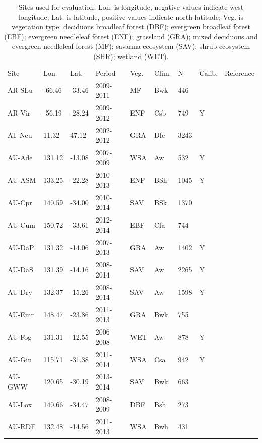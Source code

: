 \documentclass[gmd, manuscript]{copernicus}
\begin{document}
\begin{table}
\caption{Sites used for evaluation. Lon. is longitude, negative values indicate west longitude; Lat. is latitude, positive values indicate north latitude; Veg. is vegetation type: deciduous broadleaf forest (DBF); evergreen broadleaf forest (EBF); evergreen needleleaf forest (ENF); grassland (GRA); mixed deciduous and evergreen needleleaf forest (MF); savanna ecosystem (SAV); shrub ecosystem (SHR); wetland (WET).} 
\begin{tabular}{lllllllll}
  \tophline
  Site & Lon. & Lat. & Period & Veg. & Clim. & N & Calib. & Reference \\ 
  \middlehline
  AR-SLu & -66.46 & -33.46 & 2009-2011 & MF & Bwk & 446 &  & \citet{AR-SLu} \\ 
  AR-Vir & -56.19 & -28.24 & 2009-2012 & ENF & Csb & 749 & Y & \citet{AR-Vir} \\ 
  AT-Neu & 11.32 & 47.12 & 2002-2012 & GRA & Dfc & 3243 &  & \citet{AT-Neu} \\ 
  AU-Ade & 131.12 & -13.08 & 2007-2009 & WSA & Aw & 532 & Y & \citet{AU-Ade} \\ 
  AU-ASM & 133.25 & -22.28 & 2010-2013 & ENF & BSh & 1045 & Y & \citet{AU-ASM} \\ 
  AU-Cpr & 140.59 & -34.00 & 2010-2014 & SAV & BSk & 1370 &  & \citet{AU-Cpr} \\ 
  AU-Cum & 150.72 & -33.61 & 2012-2014 & EBF & Cfa & 744 &  & \citet{AU-Cum} \\ 
  AU-DaP & 131.32 & -14.06 & 2007-2013 & GRA & Aw & 1402 & Y & \citet{AU-DaP} \\ 
  AU-DaS & 131.39 & -14.16 & 2008-2014 & SAV & Aw & 2265 & Y & \citet{AU-DaS} \\ 
  AU-Dry & 132.37 & -15.26 & 2008-2014 & SAV & Aw & 1598 & Y & \citet{AU-Dry} \\ 
  AU-Emr & 148.47 & -23.86 & 2011-2013 & GRA & Bwk & 755 &  & \citet{AU-Emr} \\ 
  AU-Fog & 131.31 & -12.55 & 2006-2008 & WET & Aw & 878 & Y & \citet{AU-Fog} \\ 
  AU-Gin & 115.71 & -31.38 & 2011-2014 & WSA & Csa & 942 & Y & \citet{AU-Gin} \\ 
  AU-GWW & 120.65 & -30.19 & 2013-2014 & SAV & Bwk & 663 &  & \citet{AU-GWW} \\ 
  AU-Lox & 140.66 & -34.47 & 2008-2009 & DBF & Bsh & 273 &  & \citet{AU-Lox} \\ 
  AU-RDF & 132.48 & -14.56 & 2011-2013 & WSA & Bwh & 431 &  & \citet{AU-RDF} \\ 

\end{tabular}
\end{table}
\end{document}
